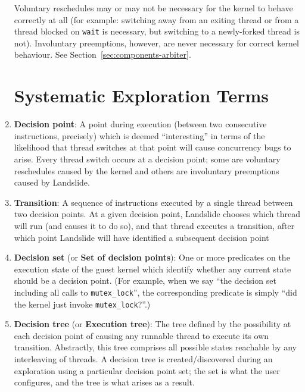 \begin{enumerate}
		Voluntary reschedules may or may not be necessary for the kernel to behave correctly at all (for example: switching away from an exiting thread or from a thread blocked on \texttt{wait} is necessary, but switching to a newly-forked thread is not). Involuntary preemptions, however, are never necessary for correct kernel behaviour.
		See Section~\ref{sec:components-arbiter}.

\section{Systematic Exploration Terms}


	\item {\bf Decision point}:
		A point during execution (between two consecutive instructions, precisely) which is deemed ``interesting'' in terms of the likelihood that thread switches at that point will cause concurrency bugs to arise. Every thread switch occurs at a decision point; some are voluntary reschedules caused by the kernel and others are involuntary preemptions caused by Landslide.
	\item {\bf Transition}:
		A sequence of instructions executed by a single thread between two decision points. At a given decision point, Landslide chooses which thread will run (and causes it to do so), and that thread executes a transition, after which point Landslide will have identified a subsequent decision point
	\item {\bf Decision set} (or {\bf Set of decision points}):
		One or more predicates on the execution state of the guest kernel which identify whether any current state should be a decision point. (For example, when we say ``the decision set including all calls to \texttt{mutex\_lock}'', the corresponding predicate is simply ``did the kernel just invoke \texttt{mutex\_lock}?''.)
	\item {\bf Decision tree} (or {\bf Execution tree}):
		The tree defined by the possibility at each decision point of causing any runnable thread to execute its own transition. Abstractly, this tree comprises all possible states reachable by any interleaving of threads.
		A decision tree is created/discovered during an exploration using a particular decision point set; the set is what the user configures, and the tree is what arises as a result.


\end{enumerate}
